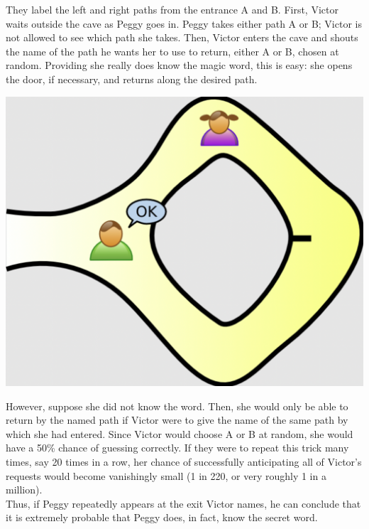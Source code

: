 \documentclass[11pt, oneside]{article}   	%
\begin{document}
They label the left and right paths from the entrance A and B. First, Victor waits outside the cave as Peggy goes in. Peggy takes either path A or B; Victor is not allowed to see which path she takes. Then, Victor enters the cave and shouts the name of the path he wants her to use to return, either A or B, chosen at random. Providing she really does know the magic word, this is easy: she opens the door, if necessary, and returns along the desired path.\\
\begin{center}
\includegraphics[scale= 0.3]{1k}
\end{center}

However, suppose she did not know the word. Then, she would only be able to return by the named path if Victor were to give the name of the same path by which she had entered. Since Victor would choose A or B at random, she would have a 50\% chance of guessing correctly. If they were to repeat this trick many times, say 20 times in a row, her chance of successfully anticipating all of Victor's requests would become vanishingly small (1 in 220, or very roughly 1 in a million).\\
Thus, if Peggy repeatedly appears at the exit Victor names, he can conclude that it is extremely probable that Peggy does, in fact, know the secret word.
\end{document}
